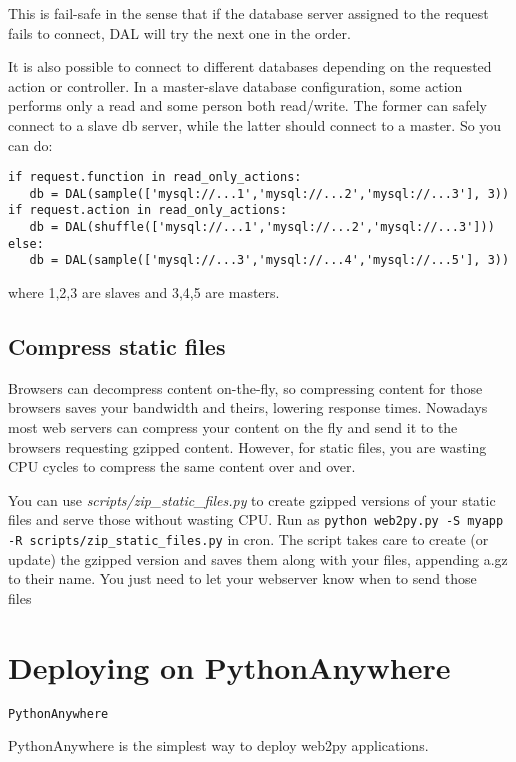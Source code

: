 \documentclass[justified,sixbynine,notoc]{tufte-book}
\def\ft{\small\tt}
\def\inxx#1{\index{#1}}
\begin{document}
\begin{fullwidth}
This is fail-safe in the sense that if the database server assigned to
the request fails to connect, DAL will try the next one in the order.

It is also possible to connect to different databases depending on the requested action or controller. In a master-slave database configuration, some action performs only a read and some person both read/write. The former can safely connect to a slave db server, while the latter should connect to a master. So you can do:

\begin{lstlisting}
if request.function in read_only_actions:
   db = DAL(sample(['mysql://...1','mysql://...2','mysql://...3'], 3))
if request.action in read_only_actions:
   db = DAL(shuffle(['mysql://...1','mysql://...2','mysql://...3']))
else:
   db = DAL(sample(['mysql://...3','mysql://...4','mysql://...5'], 3))
\end{lstlisting}
\noindent where 1,2,3 are slaves and 3,4,5 are masters.

\goodbreak\subsection{Compress static files}

Browsers can decompress content on-the-fly, so compressing content for those browsers saves your bandwidth and theirs, lowering response times.
Nowadays most web servers can compress your content on the fly and send it to the browsers requesting gzipped content.
However, for static files, you are wasting CPU cycles to compress the same content over and over.

You can use {\it scripts/zip\_static\_files.py} to create gzipped versions of your static files and serve those without wasting CPU.
Run as {\ft python web2py.py -S myapp -R scripts/zip\_static\_files.py} in cron. The script takes care to create (or update) the gzipped version and saves them along with your files, appending a.gz to their name.
You just need to let your webserver know when to send those files~\cite{apache-content-negotiation}~\cite{nginx-gzipstatic}

\goodbreak\section{Deploying on PythonAnywhere}

{\ft PythonAnywhere} \inxx{PythonAnywhere}

PythonAnywhere is the simplest way to deploy web2py applications.


\end{fullwidth}
\end{document}
